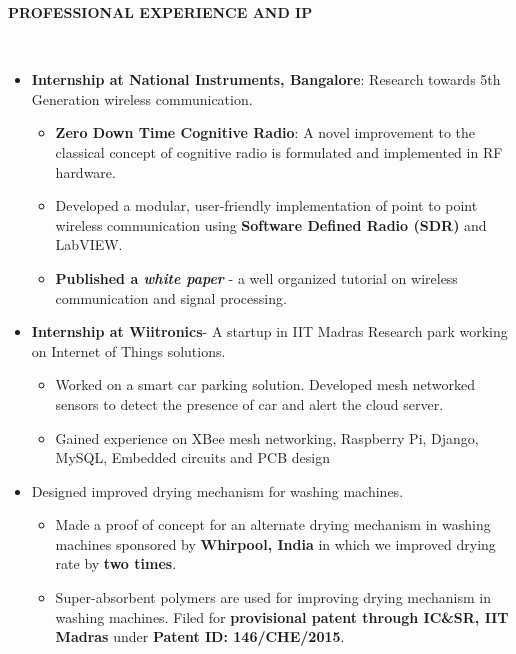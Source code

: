 \documentclass[a4paper,10pt]{article}
\newcommand{\lsep}{-0.5cm}
\newcommand{\resheading}[1]{{\small \colorbox{mygrey}{\begin{minipage}{0.975\textwidth}{\textbf{#1 \vphantom{p\^{E}}}}\end{minipage}}}}
\begin{document}
\resheading{\textbf{PROFESSIONAL EXPERIENCE AND IP} }\\[\lsep]
    \begin{itemize}
            \item \textbf{Internship at National Instruments, Bangalore}: Research towards 5th Generation wireless communication.
        \begin{itemize}
            \vspace{-5pt}
            \item \textbf{Zero Down Time Cognitive Radio}: A novel improvement to the classical concept of cognitive radio is formulated and implemented in RF hardware.
            \item Developed a modular, user-friendly implementation of point to point wireless communication using \textbf{Software Defined Radio (SDR)} and LabVIEW.
            \item \textbf{Published a \textit{white paper}} - a well organized tutorial on wireless communication and signal processing.
        \end{itemize}
        \vspace{-5pt}
        \item \textbf{Internship at Wiitronics}- A startup in IIT Madras Research park working on Internet of Things solutions.
        \vspace{-5pt}
        \begin{itemize}
            \setlength{\itemsep}{1pt}
            \item Worked on a smart car parking solution. Developed mesh networked sensors to detect the presence of car and alert the cloud server.
            \item Gained experience on XBee mesh networking, Raspberry Pi, Django, MySQL, Embedded circuits and PCB design
        \end{itemize}
        \vspace{-5pt}
        \item Designed improved drying mechanism for washing machines.
        \begin{itemize}
            \vspace{-5pt}
            \item Made a proof of concept for an alternate drying mechanism in washing machines sponsored by \textbf{Whirpool, India} in which we improved drying rate by \textbf{two times}.
            \item Super-absorbent polymers are used for improving drying mechanism in washing machines. Filed for \textbf{provisional patent through IC\&SR, IIT Madras} under \textbf{Patent ID: 146/CHE/2015}.
        \end{itemize} 
    \end{itemize}
\end{document}
